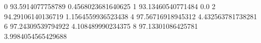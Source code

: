 0 93.5914077758789 0.4568023681640625
1 93.13460540771484 0.0
2 94.29106140136719 1.1564559936523438
4 97.56716918945312 4.432563781738281
6 97.24309539794922 4.108489990234375
8 97.13301086425781 3.9984054565429688
